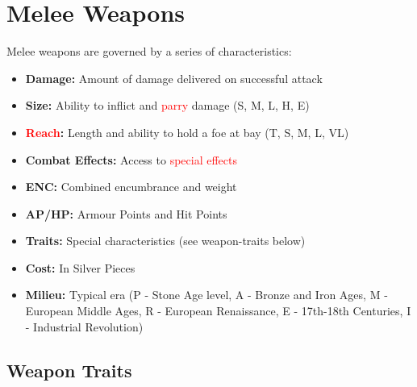 \documentclass[10pt]{article}
\begin{document}
\section{Melee Weapons}
\label{sec:melee-weapons}

Melee weapons are governed by a series of characteristics:

\begin{itemize}
    \item \textbf{Damage:} Amount of damage delivered on successful attack
    \item \textbf{Size:} Ability to inflict and \textcolor{red}{parry} damage (S, M, L, H, E)
    \item \textbf{\textcolor{red}{Reach}:} Length and ability to hold a foe at bay (T, S, M, L, VL)
    \item \textbf{Combat Effects:} Access to \textcolor{red}{special effects} 
    \item \textbf{ENC:} Combined encumbrance and weight
    \item \textbf{AP/HP:} Armour Points and Hit Points
    \item \textbf{Traits:} Special characteristics (see weapon-traits below)
    \item \textbf{Cost:} In Silver Pieces
    \item \textbf{Milieu:} Typical era (P - Stone Age level, A - Bronze and Iron Ages, M - European Middle Ages, R - European Renaissance, E - 17th-18th Centuries, I - Industrial Revolution)
\end{itemize}

\subsection{Weapon Traits}
\label{sec:weapon-traits}
\end{document}
